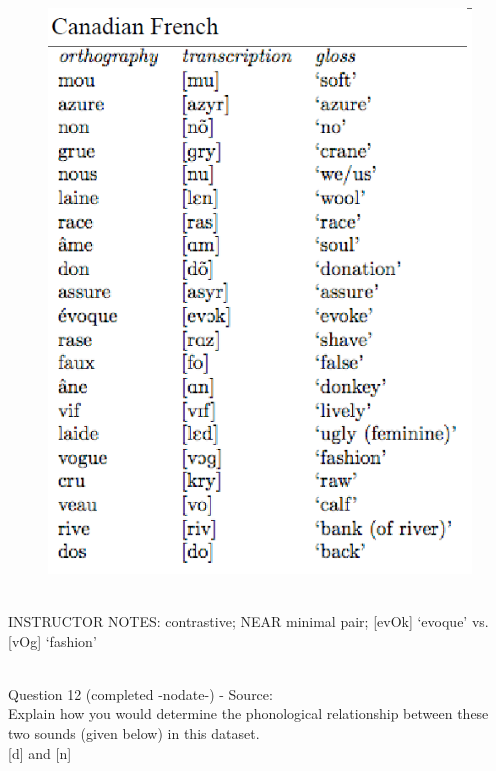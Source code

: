 \documentclass[12pt]{article}
\begin{document}
\begin{figure}[H]
\includegraphics{../images/canadianfrench.png}
\end{figure}

~\\
INSTRUCTOR NOTES: contrastive; NEAR minimal pair; [evOk] ‘evoque’ vs. [vOg] ‘fashion’


~\\

{\large Question 12} (completed -nodate-) - Source: \\

Explain how you would determine the phonological relationship between these two sounds (given below) in this dataset.\\

{[d]} and {[n]}
\end{document}
